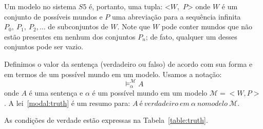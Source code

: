 Um modelo no sistema $S5$ é, portanto, uma tupla:
<$W$,~$P$>
onde $W$ é um conjunto de possíveis mundos e $P$ uma abreviação para a sequência
infinita 
$P_0,\ P_1,\ P_2,\ldots$
de subconjuntos de $W$.
Note que $W$ pode conter mundos que não estão presentes em nenhum dos conjuntos
$P_n$; de fato, qualquer um desses conjuntos pode ser vazio.

Definimos o valor da sentença (verdadeiro ou falso) de acordo com sua forma e em
termos de um possível mundo em um modelo.
Usamos a notação:
\begin{equation}
    \label{modal:truth}
    \models ^{\mathcal{M}}_{\alpha} A 
\end{equation}
onde $A$ é uma sentença e $\alpha$ é um possível mundo em um modelo
$\mathcal{M}=<W,P>$.
A lei~\ref{modal:truth} é um resumo para: $A\ é\ verdadeiro\ em\ \alpha\ no
modelo\ \mathcal{M}$.

As condições de verdade estão expressas na Tabela~\ref{table:truth}.

